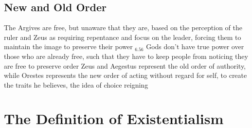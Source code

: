 \documentclass[11 pt, twoside]{article}
\newenvironment{outline*}
{
	\begin{outline}[enumerate]
	}
	{\end{outline}
}
\newcommand{\footb}[2]{\hyperlink{#1}{$_{#1.#2}$}}
\begin{document}
\subsection{New and Old Order}
\begin{outline*}
\1 The Argives are free, but unaware that they are, based on the perception of the ruler and Zeus as requiring repentance and focus on the leader, forcing them to maintain the image to preserve their power \footb{6}{56}
\2 Gods don't have true power over those who are already free, such that they have to keep people from noticing they are free to preserve order
\2 Zeus and Aegestus represent the old order of authority, while Orestes represents the new order of acting without regard for self, to create the traits he believes, the idea of choice reigning
\1 %
\end{outline*}
\section{The Definition of Existentialism}
\end{document}
